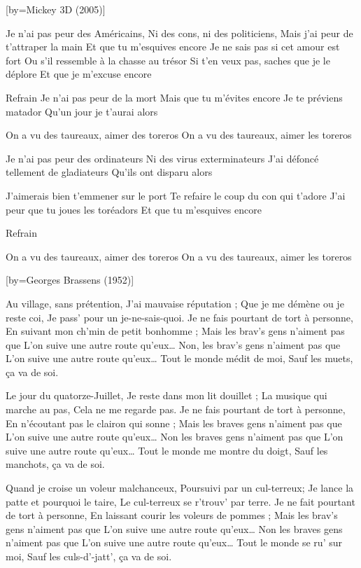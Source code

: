 [by={Mickey 3D (2005)}]

\beginverse
Je n'ai pas peur des Américains,
Ni des cons, ni des politiciens,
Mais j'ai peur de t'attraper la main
Et que tu m'esquives encore
Je ne sais pas si cet amour est fort
Ou s'il ressemble à la chasse au trésor
Si t'en veux pas, saches que je le déplore
Et que je m'excuse encore
\endverse

\beginverse
Refrain
Je n'ai pas peur de la mort
Mais que tu m'évites encore
Je te préviens matador
Qu'un jour je t'aurai alors
\endverse

\beginverse
On a vu des taureaux, aimer des toreros
On a vu des taureaux, aimer les toreros
\\[bis]
\endverse

\beginverse
Je n'ai pas peur des ordinateurs
Ni des virus exterminateurs
J'ai défoncé tellement de gladiateurs
Qu'ils ont disparu alors
\endverse

\beginverse
J'aimerais bien t'emmener sur le port
Te refaire le coup du con qui t'adore
J'ai peur que tu joues les toréadors
Et que tu m'esquives encore
\endverse

\beginverse
Refrain
\endverse

\beginverse
On a vu des taureaux, aimer des toreros
On a vu des taureaux, aimer les toreros
\endverse

[by={Georges Brassens (1952)}]

\beginverse
Au village, sans prétention,
J'ai mauvaise réputation ;
Que je me démène ou je reste coi,
Je pass’ pour un je-ne-sais-quoi.
Je ne fais pourtant de tort à personne,
En suivant mon ch’min de petit bonhomme ;
Mais les brav’s gens n'aiment pas que
L'on suive une autre route qu'eux…
Non, les brav’s gens n'aiment pas que
L'on suive une autre route qu'eux…
Tout le monde médit de moi,
Sauf les muets, ça va de soi.
\endverse

\beginverse
Le jour du quatorze-Juillet,
Je reste dans mon lit douillet ;
La musique qui marche au pas,
Cela ne me regarde pas.
Je ne fais pourtant de tort à personne,
En n'écoutant pas le clairon qui sonne ;
Mais les braves gens n'aiment pas que
L'on suive une autre route qu'eux…
Non les braves gens n'aiment pas que
L'on suive une autre route qu'eux…
Tout le monde me montre du doigt,
Sauf les manchots, ça va de soi.
\endverse

\beginverse
Quand je croise un voleur malchanceux,
Poursuivi par un cul-terreux;
Je lance la patte et pourquoi le taire,
Le cul-terreux se r’trouv’ par terre.
Je ne fait pourtant de tort à personne,
En laissant courir les voleurs de pommes ;
Mais les brav’s gens n'aiment pas que
L'on suive une autre route qu'eux…
Non les braves gens n'aiment pas que
L'on suive une autre route qu'eux…
Tout le monde se ru’ sur moi,
Sauf les culs-d’-jatt’, ça va de soi.
\endverse

